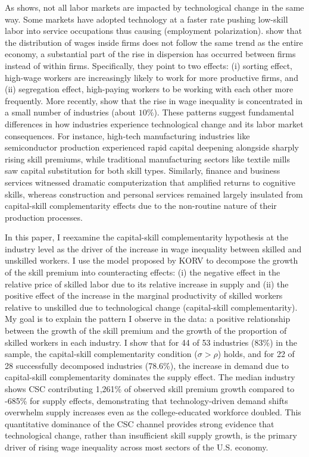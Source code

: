 \documentclass[12pt]{article}
\begin{document}
As \citet{david2013growth} shows, not all labor markets are impacted by technological change in the same way. Some markets have adopted technology at a faster rate pushing low-skill labor into service occupations thus causing (employment polarization). \citet{song2019firming} show that the distribution of wages inside firms does not follow the same trend as the entire economy, a substantial part of the rise in dispersion has occurred between firms instead of within firms. Specifically, they point to two effects: (i) sorting effect, high-wage workers are increasingly likely to work for more productive firms, and (ii) segregation effect, high-paying workers to be working with each other more frequently. More recently, \citet{haltiwanger2022industries} show that the rise in wage inequality is concentrated in a small number of industries (about $10\%$). These patterns suggest fundamental differences in how industries experience technological change and its labor market consequences. For instance, high-tech manufacturing industries like semiconductor production experienced rapid capital deepening alongside sharply rising skill premiums, while traditional manufacturing sectors like textile mills saw capital substitution for both skill types. Similarly, finance and business services witnessed dramatic computerization that amplified returns to cognitive skills, whereas construction and personal services remained largely insulated from capital-skill complementarity effects due to the non-routine nature of their production processes.

In this paper, I reexamine the capital-skill complementarity hypothesis at the industry level as the driver of the increase in wage inequality between skilled and unskilled workers. I use the model proposed by KORV to decompose the growth of the skill premium into counteracting effects: (i) the negative effect in the relative price of skilled labor due to its relative increase in supply and (ii) the positive effect of the increase in the marginal productivity of skilled workers relative to unskilled due to technological change (capital-skill complementarity). My goal is to explain the pattern I observe in the data: a positive relationship between the growth of the skill premium and the growth of the proportion of skilled workers in each industry. I show that for 44 of 53 industries (83\%) in the sample, the capital-skill complementarity condition ($\sigma > \rho$) holds, and for 22 of 28 successfully decomposed industries (78.6\%), the increase in demand due to capital-skill complementarity dominates the supply effect. The median industry shows CSC contributing 1,261\% of observed skill premium growth compared to -685\% for supply effects, demonstrating that technology-driven demand shifts overwhelm supply increases even as the college-educated workforce doubled. This quantitative dominance of the CSC channel provides strong evidence that technological change, rather than insufficient skill supply growth, is the primary driver of rising wage inequality across most sectors of the U.S. economy.
\end{document}
